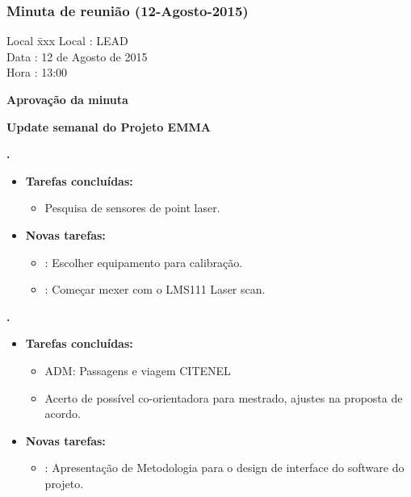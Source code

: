 \subsubsection{Minuta de reunião (12-Agosto-2015)}

\begin{tabbing}
  Local \= xxx \kill
  Local \> : LEAD \\
  Data  \> : 12 de Agosto de 2015 \\
  Hora  \> : 13:00
\end{tabbing}


\textbf{Aprovação da minuta}

\textbf{Update semanal do Projeto EMMA}
   							
\textbf{\elael.} 
	\begin{itemize}
		\item \textbf{Tarefas concluídas:}
			\begin{itemize}    
				\item Pesquisa de sensores de point laser. 
			\end{itemize}
		
		\item \textbf{Novas tarefas:}
			\begin{itemize} 
				\item: Escolher equipamento para calibração.
				\item: Começar mexer com o LMS111 Laser scan. 
			\end{itemize}
	\end{itemize}
	
	\textbf{\julia.} 
	\begin{itemize}
		\item \textbf{Tarefas concluídas:}
			\begin{itemize}    
				\item ADM: Passagens e viagem CITENEL
				\item Acerto de possível co-orientadora para mestrado, ajustes na proposta
				de acordo.
			\end{itemize}
		
		\item \textbf{Novas tarefas:}
			\begin{itemize} 
				\item: Apresentação de Metodologia para o design de interface do software do
				projeto.
			\end{itemize}
	\end{itemize}
					
